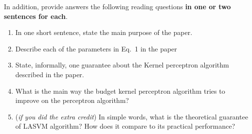 \documentclass[submit]{harvardml}
\begin{document}
\begin{problem}
In addition, provide answers the following reading questions
{\bf in one or two sentences for each}.
%
\begin{enumerate}
\item In one short sentence, state the main purpose of the paper.
\item Describe each of the parameters in Eq.~1 in the paper
\item State, informally, one guarantee about the Kernel perceptron algorithm described in the
  paper. 
\item What is the main way the budget kernel perceptron algorithm tries to
  improve on the perceptron algorithm?
\item ({\em if you did the extra credit}) In simple words, what is the theoretical guarantee of LASVM algorithm? How
  does it compare to its practical performance?
\end{enumerate}


\end{problem}
\end{document}
